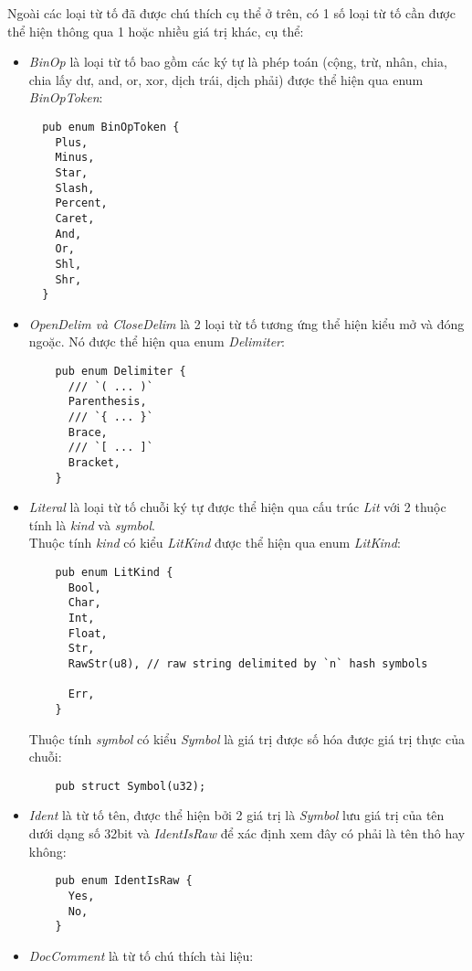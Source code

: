 Ngoài các loại từ tố đã được chú thích cụ thể ở trên, có 1 số loại từ tố cần được thể hiện thông qua 1 hoặc nhiều giá trị khác, cụ thể:
\begin{itemize}
  \item \textit{BinOp} là loại từ tố bao gồm các ký tự là phép toán (cộng, trừ, nhân, chia, chia lấy dư, and, or, xor, dịch trái, dịch phải) được thể hiện qua enum \textit{BinOpToken}:
  \begin{lstlisting}
  pub enum BinOpToken {
    Plus,
    Minus,
    Star,
    Slash,
    Percent,
    Caret,
    And,
    Or,
    Shl,
    Shr,
  }
  \end{lstlisting}
  \item \textit{OpenDelim \emph{và} CloseDelim} là 2 loại từ tố tương ứng thể hiện kiểu mở và đóng ngoặc. Nó được thể hiện qua enum \textit{Delimiter}:
  \begin{lstlisting}
    pub enum Delimiter {
      /// `( ... )`
      Parenthesis,
      /// `{ ... }`
      Brace,
      /// `[ ... ]`
      Bracket,
    }        
  \end{lstlisting}
  \item \textit{Literal} là loại từ tố chuỗi ký tự được thể hiện qua cấu trúc \textit{Lit} với 2 thuộc tính là \textit{kind} và \textit{symbol}. 
  \\Thuộc tính \textit{kind} có kiểu \textit{LitKind} được thể hiện qua enum \textit{LitKind}: 
  \begin{lstlisting}
    pub enum LitKind {
      Bool,
      Char,
      Int,
      Float,
      Str,
      RawStr(u8), // raw string delimited by `n` hash symbols
  
      Err,
    }
  \end{lstlisting}
  Thuộc tính \textit{symbol} có kiểu \textit{Symbol} là giá trị được số hóa được giá trị thực của chuỗi:
  \begin{lstlisting}
    pub struct Symbol(u32);
  \end{lstlisting}


  \item \textit{Ident} là từ tố tên, được thể hiện bởi 2 giá trị là \textit{Symbol} lưu giá trị của tên dưới dạng số 32bit và \textit{IdentIsRaw} để xác định xem đây có phải là tên thô hay không:
  \begin{lstlisting}
    pub enum IdentIsRaw {
      Yes,
      No,
    }
  \end{lstlisting}
  
  \item \textit{DocComment} là từ tố chú thích tài liệu:
  


\end{itemize}
